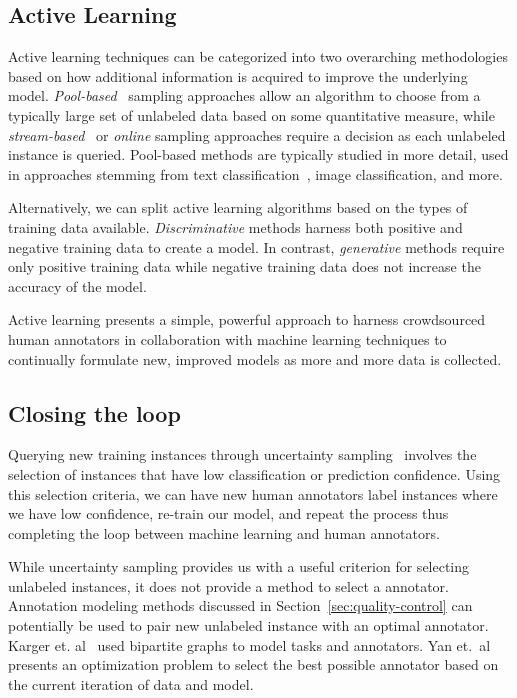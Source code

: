 \documentclass[10pt,twocolumn]{article}
\begin{document}
\subsection{Active Learning}
Active learning techniques can be categorized into two overarching 
methodologies based on how additional information is acquired to 
improve the underlying model. \textit{Pool-based}~\cite{McCallum1998} 
sampling approaches allow an algorithm to choose from a typically large set
of unlabeled data based on some quantitative measure, while 
\textit{stream-based}~\cite{Freund1997} or \textit{online} sampling approaches 
require a decision as each unlabeled instance is queried. Pool-based methods 
are typically studied in more detail, used in approaches stemming from text
classification~\cite{Lewis1994,Yan2011}, image classification, and more.

Alternatively, we can split active learning algorithms based on
the types of training data available. \textit{Discriminative} methods 
harness both positive and negative training data to create a model. 
In contrast, \textit{generative} methods require only positive training 
data while negative training data does not increase the accuracy of the model.

Active learning presents a simple, powerful approach to harness crowdsourced
human annotators in collaboration with machine learning techniques to 
continually formulate new, improved models as more and more data is collected.


\subsection{Closing the loop}
Querying new training instances through uncertainty sampling~\cite{Lewis1994}
involves the selection of instances that have low classification or prediction
confidence. Using this selection criteria, we can have new human annotators 
label instances where we have low confidence, re-train our model, and repeat
the process thus completing the loop between machine learning and human
annotators.

While uncertainty sampling provides us with a useful criterion for selecting
unlabeled instances, it does not provide a method to select a annotator. 
Annotation modeling methods discussed in Section~\ref{sec:quality-control} can
potentially be used to pair new unlabeled instance with an optimal annotator.
Karger et. al~\cite{Karger} used bipartite graphs to model tasks and annotators.
Yan et.\ al~\cite{Yan2011} presents an optimization problem to select the best possible annotator based on the current iteration of data and model.
\end{document}
